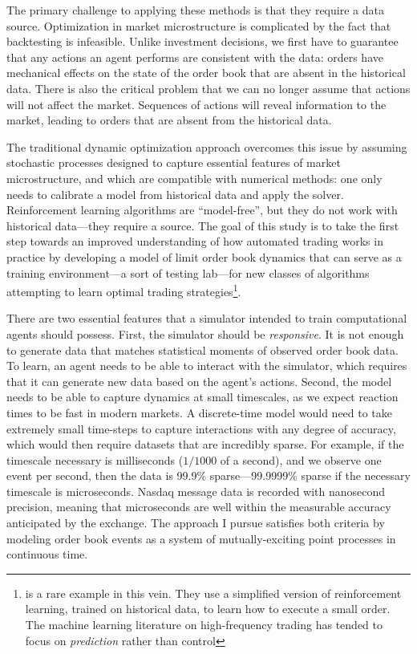 	The primary challenge to applying these methods is that they require a data source. Optimization in market microstructure is complicated by the fact that backtesting is infeasible. Unlike investment decisions, we first have to guarantee that any actions an agent performs are consistent with the data: orders have mechanical effects on the state of the order book that are absent in the historical data. There is also the critical problem that we can no longer assume that actions will not affect the market. Sequences of actions will reveal information to the market, leading to orders that are absent from the historical data.

	The traditional dynamic optimization approach overcomes this issue by assuming stochastic processes designed to capture essential features of market microstructure, and which are compatible with numerical methods: one only needs to calibrate a model from historical data and apply the solver. Reinforcement learning algorithms are ``model-free'', but they do not work with historical data---they require a source. The goal of this study is to take the first step towards an improved understanding of how automated trading works in practice by developing a model of limit order book dynamics that can serve as a training environment---a sort of testing lab---for new classes of algorithms attempting to learn optimal trading strategies\footnote{\cite{Nevmyvaka2006} is a rare example in this vein. They use a simplified version of reinforcement learning, trained on historical data, to learn how to execute a small order. The machine learning literature on high-frequency trading has tended to focus on \textit{prediction} rather than control}.

	There are two essential features that a simulator intended to train computational agents should possess. First, the simulator should be \textit{responsive}. It is not enough to generate data that matches statistical moments of observed order book data. To learn, an agent needs to be able to interact with the simulator, which requires that it can generate new data based on the agent's actions. Second, the model needs to be able to capture dynamics at small timescales, as we expect reaction times to be fast in modern markets. A discrete-time model would need to take extremely small time-steps to capture interactions with any degree of accuracy, which would then require datasets that are incredibly sparse. For example, if the timescale necessary is milliseconds ($1/1000$ of a second), and we observe one event per second, then the data is 99.9\% sparse---99.9999\% sparse if the necessary timescale is microseconds. Nasdaq message data is recorded with nanosecond precision, meaning that microseconds are well within the measurable accuracy anticipated by the exchange. The approach I pursue satisfies both criteria by modeling order book events as a system of mutually-exciting point processes in continuous time.

